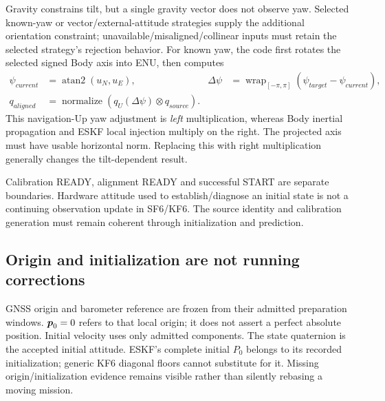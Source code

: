 Gravity constrains tilt, but a single gravity vector does not observe yaw. Selected known-yaw or vector/external-attitude strategies supply the additional orientation constraint; unavailable/misaligned/collinear inputs must retain the selected strategy's rejection behavior. For known yaw, the code first rotates the selected signed Body axis into ENU, then computes
\begin{align}
\psi_{current}&=\operatorname{atan2}(u_N,u_E),&
\Delta\psi&=\operatorname{wrap}_{[-\pi,\pi]}(\psi_{target}-\psi_{current}),\\
q_{aligned}&=\operatorname{normalize}(q_U(\Delta\psi)\otimes q_{source}).
\end{align}
This navigation-Up yaw adjustment is \emph{left} multiplication, whereas Body inertial propagation and ESKF local injection multiply on the right. The projected axis must have usable horizontal norm. Replacing this with right multiplication generally changes the tilt-dependent result.

Calibration READY, alignment READY and successful START are separate boundaries. Hardware attitude used to establish/diagnose an initial state is not a continuing observation update in SF6/KF6. The source identity and calibration generation must remain coherent through initialization and prediction.


\subsection{Origin and initialization are not running corrections}
GNSS origin and barometer reference are frozen from their admitted preparation windows. $\boldsymbol{p}_0=0$ refers to that local origin; it does not assert a perfect absolute position. Initial velocity uses only admitted components. The state quaternion is the accepted initial attitude. ESKF's complete initial $P_0$ belongs to its recorded initialization; generic KF6 diagonal floors cannot substitute for it. Missing origin/initialization evidence remains visible rather than silently rebasing a moving mission.
